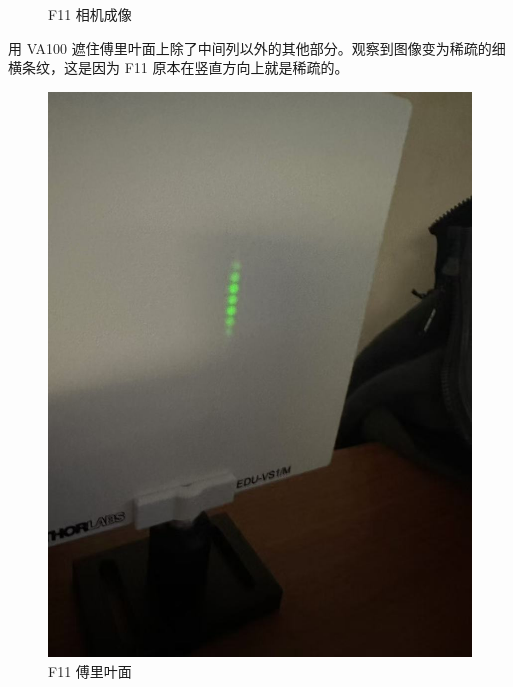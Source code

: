 \documentclass{ctexart}
\begin{document}
\begin{figure}[H]
\begin{minipage}[b]{0.3\textwidth}
    \caption{F11 相机成像}
  \end{minipage}
\end{figure}

用 VA100 遮住傅里叶面上除了中间列以外的其他部分。观察到图像变为稀疏的细横条纹，这是因为 F11 原本在竖直方向上就是稀疏的。
\begin{figure}[H]
  \centering
  \begin{minipage}[b]{0.2\textwidth}
    \centering
    \includegraphics[width=\textwidth]{pictures/微信图片_20241017164822.jpg}
    \caption{F11 傅里叶面}
  \end{minipage}
  \hspace{0.1\textwidth} %
  \begin{minipage}[b]{0.3\textwidth}
    \centering

\end{minipage}
\end{figure}
\end{document}
